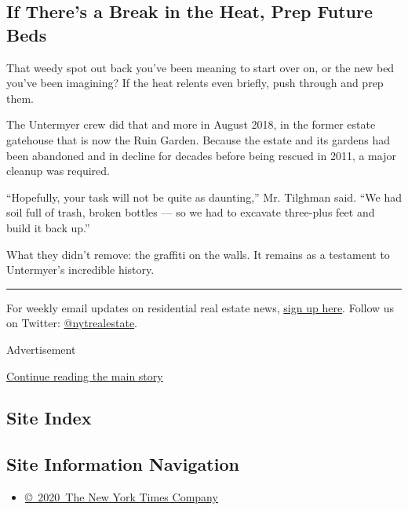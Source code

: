 \hypertarget{if-theres-a-break-in-the-heat-prep-future-beds}{%
\subsection{If There's a Break in the Heat, Prep Future
Beds}\label{if-theres-a-break-in-the-heat-prep-future-beds}}

That weedy spot out back you've been meaning to start over on, or the
new bed you've been imagining? If the heat relents even briefly, push
through and prep them.

The Untermyer crew did that and more in August 2018, in the former
estate gatehouse that is now the Ruin Garden. Because the estate and its
gardens had been abandoned and in decline for decades before being
rescued in 2011, a major cleanup was required.

``Hopefully, your task will not be quite as daunting,'' Mr. Tilghman
said. ``We had soil full of trash, broken bottles --- so we had to
excavate three-plus feet and build it back up.''

What they didn't remove: the graffiti on the walls. It remains as a
testament to Untermyer's incredible history.

\begin{center}\rule{0.5\linewidth}{\linethickness}\end{center}

For weekly email updates on residential real estate news,
\href{http://www.nytimes.com/newsletters/realestate/}{sign up here}.
Follow us on Twitter:
\href{https://twitter.com/nytrealestate}{@nytrealestate}.

Advertisement

\protect\hyperlink{after-bottom}{Continue reading the main story}

\hypertarget{site-index}{%
\subsection{Site Index}\label{site-index}}

\hypertarget{site-information-navigation}{%
\subsection{Site Information
Navigation}\label{site-information-navigation}}

\begin{itemize}
\tightlist
\item
  \href{https://help.nytimes.com/hc/en-us/articles/115014792127-Copyright-notice}{©~2020~The
  New York Times Company}
\end{itemize}

